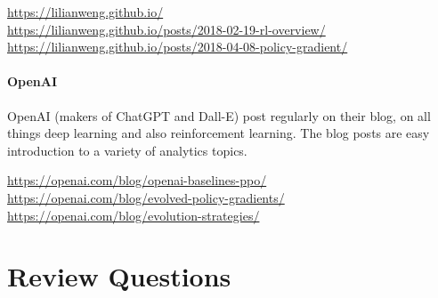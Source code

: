 \begin{tcolorbox}[colback=code]
\footnotesize
\url{https://lilianweng.github.io/} \\

\url{https://lilianweng.github.io/posts/2018-02-19-rl-overview/}\\

\url{https://lilianweng.github.io/posts/2018-04-08-policy-gradient/}
\end{tcolorbox}


\paragraph*{OpenAI}

OpenAI (makers of ChatGPT and Dall-E) post regularly on their blog, on all things deep learning and also reinforcement learning. The blog posts are easy introduction to a variety of analytics topics. \\

\begin{tcolorbox}[colback=code]
\footnotesize
\url{https://openai.com/blog/openai-baselines-ppo/} \\

\url{https://openai.com/blog/evolved-policy-gradients/} \\

\url{https://openai.com/blog/evolution-strategies/}
\end{tcolorbox}

\section{Review Questions}

